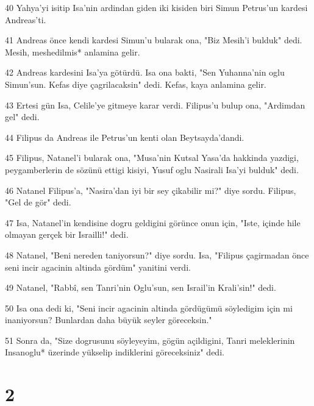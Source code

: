 \par 40 Yahya'yi isitip Isa'nin ardindan giden iki kisiden biri Simun Petrus'un kardesi Andreas'ti.
\par 41 Andreas önce kendi kardesi Simun'u bularak ona, "Biz Mesih'i bulduk" dedi. Mesih, meshedilmis* anlamina gelir.
\par 42 Andreas kardesini Isa'ya götürdü. Isa ona bakti, "Sen Yuhanna'nin oglu Simun'sun. Kefas diye çagrilacaksin" dedi. Kefas, kaya anlamina gelir.
\par 43 Ertesi gün Isa, Celile'ye gitmeye karar verdi. Filipus'u bulup ona, "Ardimdan gel" dedi.
\par 44 Filipus da Andreas ile Petrus'un kenti olan Beytsayda'dandi.
\par 45 Filipus, Natanel'i bularak ona, "Musa'nin Kutsal Yasa'da hakkinda yazdigi, peygamberlerin de sözünü ettigi kisiyi, Yusuf oglu Nasirali Isa'yi bulduk" dedi.
\par 46 Natanel Filipus'a, "Nasira'dan iyi bir sey çikabilir mi?" diye sordu. Filipus, "Gel de gör" dedi.
\par 47 Isa, Natanel'in kendisine dogru geldigini görünce onun için, "Iste, içinde hile olmayan gerçek bir Israilli!" dedi.
\par 48 Natanel, "Beni nereden taniyorsun?" diye sordu. Isa, "Filipus çagirmadan önce seni incir agacinin altinda gördüm" yanitini verdi.
\par 49 Natanel, "Rabbî, sen Tanri'nin Oglu'sun, sen Israil'in Krali'sin!" dedi.
\par 50 Isa ona dedi ki, "Seni incir agacinin altinda gördügümü söyledigim için mi inaniyorsun? Bunlardan daha büyük seyler göreceksin."
\par 51 Sonra da, "Size dogrusunu söyleyeyim, gögün açildigini, Tanri meleklerinin Insanoglu* üzerinde yükselip indiklerini göreceksiniz" dedi.

\chapter{2}

